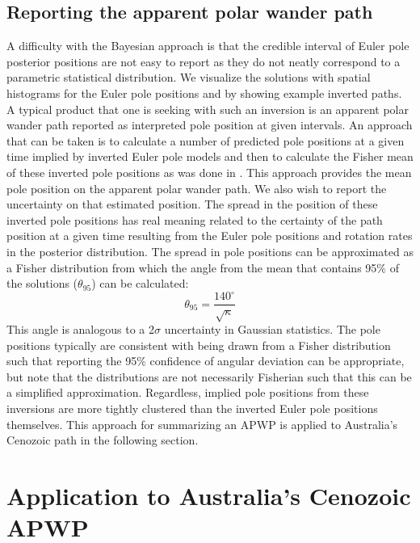 \documentclass[]{agujournal2019}
\begin{document}
\subsection*{Reporting the apparent polar wander path}
\label{sec:age_uncertainty}
A difficulty with the Bayesian approach is that the credible interval of Euler pole posterior positions are not easy to report as they do not neatly correspond to a parametric statistical distribution. We visualize the solutions with spatial histograms for the Euler pole positions and by showing example inverted paths. A typical product that one is seeking with such an inversion is an apparent polar wander path reported as interpreted pole position at given intervals. An approach that can be taken is to calculate a number of predicted pole positions at a given time implied by inverted Euler pole models and then to calculate the Fisher mean of these inverted pole positions as was done in . This approach provides the mean pole position on the apparent polar wander path. We also wish to report the uncertainty on that estimated position. The spread in the position of these inverted pole positions has real meaning related to the certainty of the path position at a given time resulting from the Euler pole positions and rotation rates in the posterior distribution. The spread in pole positions can be approximated as a Fisher distribution from which the angle from the mean that contains 95$\%$ of the solutions ($\theta_{95}$) can be calculated:
\begin{equation}
\theta_{95}=\frac{140^{\circ}}{\sqrt{\kappa}}
\label{eq:angular_deviation}
\end{equation}
This angle is analogous to a 2$\sigma$ uncertainty in Gaussian statistics.  The pole positions typically are consistent with being drawn from a Fisher distribution such that reporting the 95$\%$ confidence of angular deviation can be appropriate, but note that the distributions are not necessarily Fisherian such that this can be a simplified approximation. Regardless, implied pole positions from these inversions are more tightly clustered than the inverted Euler pole positions themselves. This approach for summarizing an APWP is applied to Australia's Cenozoic path in the following section.

\section*{Application to Australia's Cenozoic APWP}
\label{sec:australia}
\end{document}
